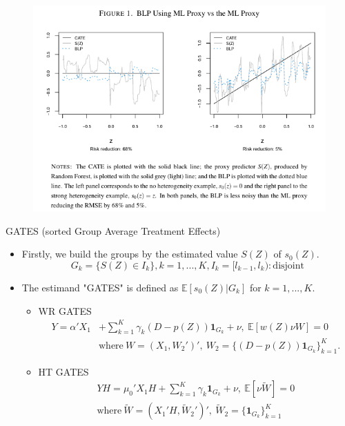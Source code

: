 \documentclass[xcolor=svgnames,aspectratio=169]{beamer}
\newcommand{\E}{\mathbb{E}}
\begin{document}
\begin{frame}
    \begin{figure}
        \includegraphics[width=1.5\textwidth, height=\textheight, keepaspectratio]{CATE.png}
    \end{figure}
\end{frame}

\begin{frame}{GATES (sorted Group Average Treatment Effects)}
    \begin{itemize}
        \item Firstly, we build the groups by the estimated value $S(Z)$ of $s_0(Z)$.
        \[
        G_k=\{S(Z)\in I_k\}, k=1,...,K, I_k=[l_{k-1},l_k) : \text{disjoint}
        \]
        \item The estimand "GATES" is defined as $\E[s_0(Z)|G_k]$ for $k=1,...,K$.
        \begin{itemize}
            \item WR GATES
        \begin{align*}
            Y=\alpha'X_1&+\sum_{k=1}^{K}\gamma_k(D-p(Z))\mathbf{1}_{G_k}+\nu, \  \E[w(Z)\nu W]=0 \\
            &\text{where} \ W=(X_1, W_2')', \ W_2=\{(D-p(Z))\mathbf{1}_{G_k}\}_{k=1}^K.
        \end{align*}
        \item HT GATES
        \begin{align*}
            YH=\mu_0'X_1H+\sum_{k=1}^{K} \gamma_k\mathbf{1}_{G_k}+\nu, \ \E[\nu \tilde{W}]=0 \\
            \text{where} \ \tilde{W}=(X_1'H, \tilde{W}_2')', \ \tilde{W}_2=\{\mathbf{1}_{G_k}\}_{k=1}^K
        \end{align*}
        \end{itemize}
    \end{itemize}
\end{frame}
\end{document}
